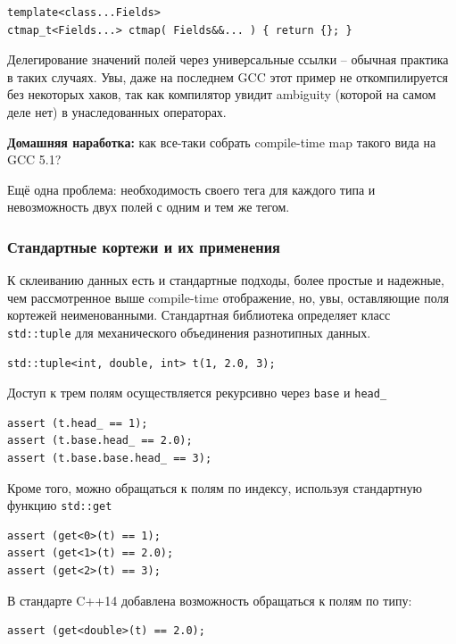 \documentclass[a4paper,12pt,oneside]{article}
\begin{document}
\begin{lstlisting}
template<class...Fields>
ctmap_t<Fields...> ctmap( Fields&&... ) { return {}; }
\end{lstlisting}

Делегирование значений полей через универсальные ссылки -- обычная практика в таких случаях. Увы, даже на последнем GCC этот пример не откомпилируется без некоторых хаков, так как компилятор увидит ambiguity (которой на самом деле нет) в унаследованных операторах.

\textbf{Домашняя наработка:} как все-таки собрать compile-time map такого вида на GCC 5.1?

Ещё одна проблема: необходимость своего тега для каждого типа и невозможность двух полей с одним и тем же тегом.

\subsubsection{Стандартные кортежи и их применения}

К склеиванию данных есть и стандартные подходы, более простые и надежные, чем рассмотренное выше compile-time отображение, но, увы, оставляющие поля кортежей неименованными. Стандартная библиотека определяет класс \lstinline!std::tuple! для механического объединения разнотипных данных.

\begin{lstlisting}
std::tuple<int, double, int> t(1, 2.0, 3);
\end{lstlisting}

Доступ к трем полям осуществляется рекурсивно через \lstinline!base! и \lstinline!head_!

\begin{lstlisting}
assert (t.head_ == 1);
assert (t.base.head_ == 2.0);
assert (t.base.base.head_ == 3);
\end{lstlisting}

Кроме того, можно обращаться к полям по индексу, используя стандартную функцию \lstinline!std::get!

\begin{lstlisting}
assert (get<0>(t) == 1);
assert (get<1>(t) == 2.0);
assert (get<2>(t) == 3);
\end{lstlisting}

В стандарте C++14 добавлена возможность обращаться к полям по типу:

\begin{lstlisting}
assert (get<double>(t) == 2.0);
\end{lstlisting}
\end{document}
